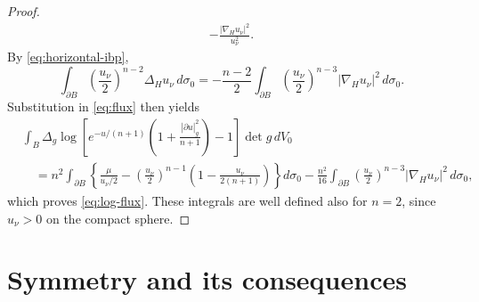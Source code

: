 \documentclass[11pt]{article}
\begin{document}
\begin{proof}
\begin{align*}
       -\frac{|\nabla_Hu_\nu|^2}{u_\nu^2}.
\end{align*}
By \eqref{eq:horizontal-ibp},
$$
 \int_{\partial B}\left(\frac{u_\nu}{2}\right)^{n-2}
       \Delta_Hu_\nu\,d\sigma_0
 =-\frac{n-2}{2}\int_{\partial B}
       \left(\frac{u_\nu}{2}\right)^{n-3}|\nabla_Hu_\nu|^2\,d\sigma_0.
$$
Substitution in \eqref{eq:flux} then yields
\begin{align*}
 &\int_B\Delta_g\log\left[e^{-u/(n+1)}\left(1+\frac{|\partial u|_g^2}{n+1}\right)-1\right]\det g\,dV_0\\
 &\quad=n^2\int_{\partial B}
 \left\{\frac{\mu}{u_\nu/2}-
 \left(\frac{u_\nu}{2}\right)^{n-1}
 \left(1-\frac{u_\nu}{2(n+1)}\right)\right\}d\sigma_0-\frac{n^2}{16}\int_{\partial B}
 \left(\frac{u_\nu}{2}\right)^{n-3}|\nabla_Hu_\nu|^2\,d\sigma_0,
\end{align*}
which proves \eqref{eq:log-flux}. These integrals are well defined
also for $n=2$, since $u_\nu>0$ on the compact sphere.
\end{proof}

\section{Symmetry and its consequences}\label{sec:normalized}
\end{document}
